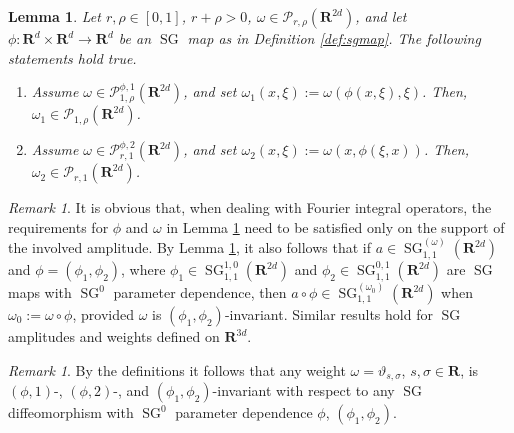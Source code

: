\documentclass[12pt,a4paper,reqno]{amsart}
\numberwithin{equation}{section}
\numberwithin{thm}{section}
\newtheorem{lemma}[thm]{Lemma}
\theoremstyle{definition}
\theoremstyle{remark}
\newtheorem{rem}[thm]{Remark}
\begin{document}
\par

\begin{lemma}\label{lemma:omegainv}
	Let $r,\rho\in[0,1]$, $r+\rho>0$, $\omega\in{\mathscr P}
	_{r,\rho}({\mathbf R^{{2d}}})$, and let 
	$\phi\colon{\mathbf R^{{d}}}\times{\mathbf R^{{d}}}\to{\mathbf R^{{d}}}$
	be an ${\operatorname{SG}}$ map as in Definition \ref{def:sgmap}.
	The following statements hold true.
		\begin{enumerate}
				\item Assume $\omega\in{\mathscr P}_{1,\rho}^{\phi,1}({\mathbf R^{{2d}}})$, 
		and set $\omega_1(x,\xi):=\omega(\phi(x,\xi),\xi)$.
		Then, $\omega_1\in{\mathscr P}_{1,\rho}({\mathbf R^{{2d}}})$.
				\item Assume $\omega\in{\mathscr P}_{r,1}^{\phi,2}({\mathbf R^{{2d}}})$, 
		and set $\omega_2(x,\xi):=\omega(x,\phi(\xi,x))$.
		Then, $\omega_2\in{\mathscr P}_{r,1}({\mathbf R^{{2d}}})$.
			\end{enumerate}
	\end{lemma}
\begin{rem}
\label{rem:3.2}
It is obvious that, when dealing with Fourier integral operators,
the requirements for $\phi$ and $\omega$ in Lemma \ref{lemma:omegainv}
need to be  satisfied only on the support of the involved amplitude.
By Lemma \ref{lemma:omegainv}, 
it also follows that if $a \in {\operatorname{SG}}^{(\omega)}_{1,1}({\mathbf R^{{2d}}})$ and
$\phi=(\phi_1,\phi_2)$, where
$\phi_1\in  {\operatorname{SG}}^{1,0}_{1,1}({\mathbf R^{{2d}}})$ and $\phi_2\in  {\operatorname{SG}}^{0,1}_{1,1}({\mathbf R^{{2d}}})$
are ${\operatorname{SG}}$ maps with ${\operatorname{SG}}^0$ parameter dependence, 
then $a\circ \phi \in {\operatorname{SG}}^{({\omega _0})}_{1,1}({\mathbf R^{{2d}}})$ when
${\omega _0}:=\omega \circ \phi$,
provided $\omega$ is $(\phi _1,\phi _2)$-invariant. Similar results
hold for ${\operatorname{SG}}$ amplitudes and weights defined on ${\mathbf R^{{3d}}}$.
\end{rem}

\par

\begin{rem}\label{rem:trivweight}
	By the definitions it follows that any weight
	$\omega=\vartheta_{s,\sigma}$, $s,\sigma\in\mathbf R$,
	 is $(\phi,1)$-,
	$(\phi,2)$-, and $(\phi_1,\phi_2)$-invariant with respect to any
	${\operatorname{SG}}$ diffeomorphism 
	with ${\operatorname{SG}}^0$ parameter dependence $\phi$, $(\phi_1,\phi_2)$. 
\end{rem}
\end{document}
